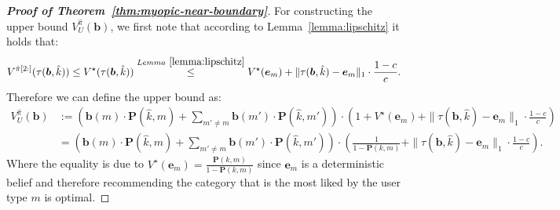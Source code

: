 \begin{proof}[\normalfont\bfseries Proof of Theorem~\ref{thm:myopic-near-boundary}]
    For constructing the upper bound $V^{\hat{\pi}}_{U}(\bm{b})$, we first note that according to Lemma~\ref{lemma:lipschitz} it holds that:
    \[
        V^{\hat{\pi}[2:]}(\tau(\bm{b}, \hat{k})) \leq V^{\star}(\tau(\bm{b}, \hat{k})) \overset{Lemma~\ref{lemma:lipschitz}}{\leq} V^{\star}(\bm e_m) + \lVert\tau(\bm{b}, \hat{k}) - \bm e_m\rVert_1 \cdot \frac{1-c}{c}.
    \]
    Therefore we can define the upper bound as:
    \begin{align*}
       V^{\hat{\pi}}_{U}(\mathbf{b}) &:= \left( \mathbf{b}(m) \cdot \mathbf{P}(\hat{k}, m) + \sum_{m' \neq m} \mathbf{b}(m') \cdot \mathbf{P}(\hat{k}, m') \right) \cdot \left( 1 + V^\star(\mathbf{e}_m) + \|\tau(\mathbf{b}, \hat{k}) - \mathbf{e}_m\|_1 \cdot \frac{1-c}{c} \right) \\
       &= \left( \mathbf{b}(m) \cdot \mathbf{P}(\hat{k}, m) + \sum_{m' \neq m} \mathbf{b}(m') \cdot \mathbf{P}(\hat{k}, m') \right)
       \cdot \left( \frac{1}{1 - \mathbf{P}(k, m)} + \|\tau(\mathbf{b}, \hat{k}) - \mathbf{e}_m\|_1 \cdot \frac{1-c}{c} \right).
    \end{align*}
    Where the equality is due to $V^{\star}(\bm e_m) = \frac{\bm{P}(k, m)}{1 - \bm{P}(k, m)}$ since $\bm e_m$ is a deterministic belief and therefore recommending the category that is the most liked by the user type $m$ is optimal.    


\end{proof}
